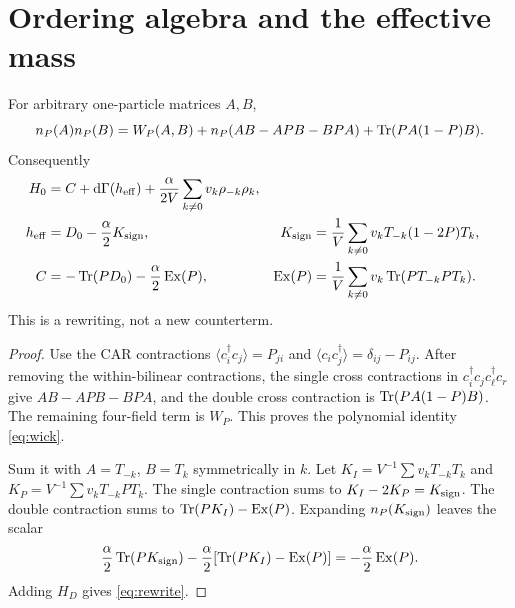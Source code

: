 \section{Ordering algebra and the effective mass}
\label{sec:ordering}
\begin{lemma}\label{lem:wick}
For arbitrary one-particle matrices $A,B$,
\begin{equation}
n_P(A)n_P(B)=W_P(A,B)+n_P(AB-APB-BPA)
+\operatorname{Tr}(PA(1-P)B).
\label{eq:wick}
\end{equation}
Consequently
\begin{align}
H_0&=C+\mathrm d\Gamma(h_{\mathrm{eff}})
+\frac{\alpha}{2V}\sum_{k\ne0}v_k\rho_{-k}\rho_k,
\label{eq:rewrite}\\
h_{\mathrm{eff}}&=D_0-\frac\alpha2K_{\rm sign},&
K_{\rm sign}&=\frac1V\sum_{k\ne0}v_kT_{-k}(1-2P)T_k,\\
C&=-\operatorname{Tr}(PD_0)-\frac\alpha2\operatorname{Ex}(P),&
\operatorname{Ex}(P)&=\frac1V\sum_{k\ne0}v_k\operatorname{Tr}(PT_{-k}PT_k).
\label{eq:constant}
\end{align}
This is a rewriting, not a new counterterm.
\end{lemma}
\begin{proof}
Use the CAR contractions
$\langle c_i^\dagger c_j\rangle=P_{ji}$ and
$\langle c_i c_j^\dagger\rangle=\delta_{ij}-P_{ij}$.
After removing the within-bilinear contractions, the single cross
contractions in $c_i^\dagger c_jc_\ell^\dagger c_r$ give
$AB-APB-BPA$, and the double cross contraction is
$\operatorname{Tr}(PA(1-P)B)$. The remaining four-field term is $W_P$.
This proves the polynomial identity \eqref{eq:wick}.

Sum it with $A=T_{-k}$, $B=T_k$ symmetrically in $k$.
Let $K_I=V^{-1}\sum v_kT_{-k}T_k$ and
$K_P=V^{-1}\sum v_kT_{-k}PT_k$.
The single contraction sums to $K_I-2K_P=K_{\rm sign}$.
The double contraction sums to $\operatorname{Tr}(PK_I)-\operatorname{Ex}(P)$.
Expanding $n_P(K_{\rm sign})$ leaves the scalar
\[
\frac\alpha2\operatorname{Tr}(PK_{\rm sign})
-\frac\alpha2[\operatorname{Tr}(PK_I)-\operatorname{Ex}(P)]=-\frac\alpha2\operatorname{Ex}(P).
\]
Adding $H_D$ gives \eqref{eq:rewrite}.
\end{proof}

